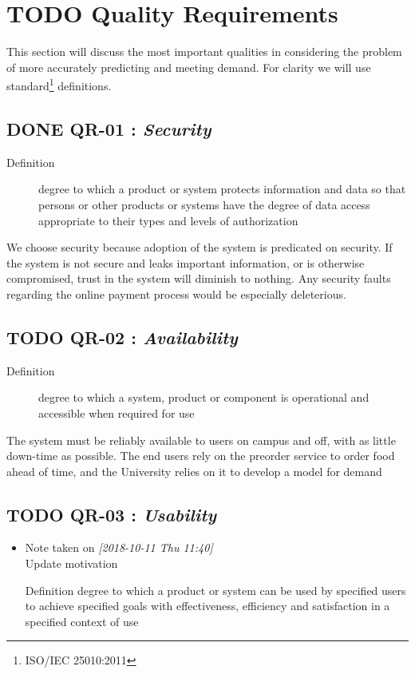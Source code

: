 \documentclass[11pt]{article}
\begin{document}
\section{{\bfseries\sffamily TODO} Quality Requirements}
\label{sec:orgc82863c}

This section will discuss the most important qualities in
considering the problem of more accurately predicting and meeting
demand. For clarity we will use standard\footnote{ISO/IEC 25010:2011} definitions.

\subsection{{\bfseries\sffamily DONE} \label{org26e6952}QR-01 : \emph{Security}}
\label{sec:orga5a5cc8}
\begin{description}
\item[{Definition}] degree to which a product or system protects
information and data so that persons or other
products or systems have the degree of data access
appropriate to their types and levels of
authorization
\end{description}


We choose security because adoption of the system is predicated on
security. If the system is not secure and leaks important
information, or is otherwise compromised, trust in the system will
diminish to nothing. Any security faults regarding the online
payment process would be especially deleterious.
\subsection{{\bfseries\sffamily TODO} \label{org9567a82}QR-02 : \emph{Availability}}
\label{sec:orgb1f586e}
\begin{description}
\item[{Definition}] degree to which a system, product or component is
operational and accessible when required for use
\end{description}


The system must be reliably available to users on campus and off,
with as little down-time as possible. The end users rely on the
preorder service to order food ahead of time, and the University
relies on it to develop a model for demand

\subsection{{\bfseries\sffamily TODO} \label{orgbc51223}QR-03 : \emph{Usability}}
\label{sec:org0d3639e}
\begin{itemize}
\item Note taken on \textit{[2018-10-11 Thu 11:40] } \\
Update motivation
\item[{Definition}] degree to which a product or system can be used by
specified users to achieve specified goals with
effectiveness, efficiency and satisfaction in a
specified context of use
\end{itemize}
\end{document}
